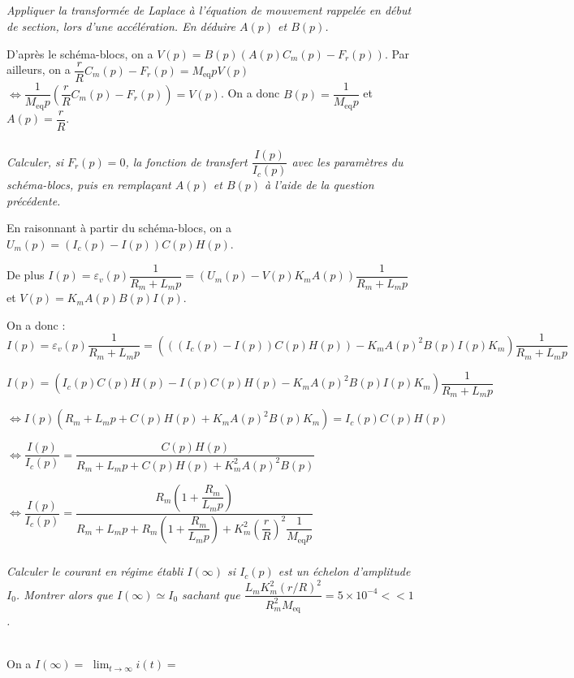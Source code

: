 \documentclass[10pt,fleqn]{article} %
\begin{document}
\begin{multicols}{2}
\subparagraph{}
\textit{Appliquer la transformée de Laplace à l’équation de mouvement rappelée en début de section, lors d’une accélération. En déduire $A(p)$ et $B(p)$.}
\ifprof
\begin{corrige}
D'après le schéma-blocs, on a $V(p)=B(p)\left(A(p)C_m(p)-F_r(p) \right)$. Par ailleurs, 
on a $\dfrac{r}{R}C_m(p)-F_r(p)=M_{\text{eq}} pV(p)$ $ \Leftrightarrow  \dfrac{1}{M_{\text{eq}} p} \left(\dfrac{r}{R}C_m(p)- F_r(p)\right)=V(p)$. On a donc $B(p)=\dfrac{1}{M_{\text{eq}} p}$ et $A(p)=\dfrac{r}{R}$.
\end{corrige}
\else
\fi


\subparagraph{}
\textit{Calculer, si $F_r(p) = 0$, la fonction de transfert $\dfrac{I(p)}{I_c(p)}$ avec les paramètres du schéma-blocs, puis en remplaçant $A(p)$ et $B(p)$ à l’aide de la question précédente.}
\ifprof
\begin{corrige}
En raisonnant à partir du schéma-blocs, on a $U_m(p)=\left(I_c(p)-I(p)\right)C(p)H(p)$. 

De plus $I(p)=\varepsilon_v(p)\dfrac{1}{R_m + L_m p}=\left(U_m(p)-V(p) K_m A(p) \right)\dfrac{1}{R_m + L_m p}$ et $V(p)=K_m A(p) B(p) I(p)$. 

On a donc : 
$I(p)=\varepsilon_v(p)\dfrac{1}{R_m + L_m p}=\left(\left(\left(I_c(p)-I(p)\right)C(p)H(p) \right)-K_m A(p)^2B(p) I(p) K_m  \right)\dfrac{1}{R_m + L_m p}$


$I(p)=\left(I_c(p)C(p)H(p)-I(p)C(p)H(p) -K_m A(p)^2B(p) I(p) K_m  \right)\dfrac{1}{R_m + L_m p}$


$\Leftrightarrow I(p)\left( R_m + L_m p+C(p)H(p)+K_m A(p)^2B(p) K_m\right)=I_c(p)C(p)H(p) $

$\Leftrightarrow \dfrac{I(p)}{I_c(p)}=\dfrac{C(p)H(p)}{ R_m + L_m p+C(p)H(p)+K_m^2 A(p)^2B(p) }$

$\Leftrightarrow \dfrac{I(p)}{I_c(p)}=\dfrac{ R_m\left( 1+\dfrac{R_m}{L_m p}\right)}{ R_m + L_m p+ R_m\left( 1+\dfrac{R_m}{L_m p}\right) +K_m^2 \left(\dfrac{r}{R}\right)^2 \dfrac{1}{M_{\text{eq}} p}   }$
\end{corrige}
\else
\fi


\subparagraph{}
\textit{Calculer le courant en régime établi $I(\infty)$ si $I_c(p)$ est un échelon d’amplitude $I_0$. Montrer alors que $I(\infty) \simeq I_0$ sachant que $\dfrac{L_mK_m^2\left(r/R\right)^2}{R_m^2 M_{\text{eq}}}=5\times 10^{-4} << 1$.}
\ifprof
\begin{corrige} ~\\

On a $I(\infty) =$ $ \lim_{t\to\infty} i(t)=$ 


\end{corrige}
\end{multicols}
\end{document}
